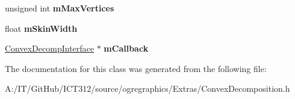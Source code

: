 \begin{DoxyCompactItemize}
\item 
\hypertarget{class_convex_decomposition_1_1_decomp_desc_aebaa387f6e17beac565adf831b535dc0}{unsigned int {\bfseries m\-Max\-Vertices}}\label{class_convex_decomposition_1_1_decomp_desc_aebaa387f6e17beac565adf831b535dc0}

\item 
\hypertarget{class_convex_decomposition_1_1_decomp_desc_a60d16f6a176268ca4ddf940fd247015b}{float {\bfseries m\-Skin\-Width}}\label{class_convex_decomposition_1_1_decomp_desc_a60d16f6a176268ca4ddf940fd247015b}

\item 
\hypertarget{class_convex_decomposition_1_1_decomp_desc_aed8ce4212508ed98f8002e53372ccc84}{\hyperlink{class_convex_decomposition_1_1_convex_decomp_interface}{Convex\-Decomp\-Interface} $\ast$ {\bfseries m\-Callback}}\label{class_convex_decomposition_1_1_decomp_desc_aed8ce4212508ed98f8002e53372ccc84}

\end{DoxyCompactItemize}


The documentation for this class was generated from the following file\-:\begin{DoxyCompactItemize}
\item 
A\-:/\-I\-T/\-Git\-Hub/\-I\-C\-T312/source/ogregraphics/\-Extras/Convex\-Decomposition.\-h\end{DoxyCompactItemize}
